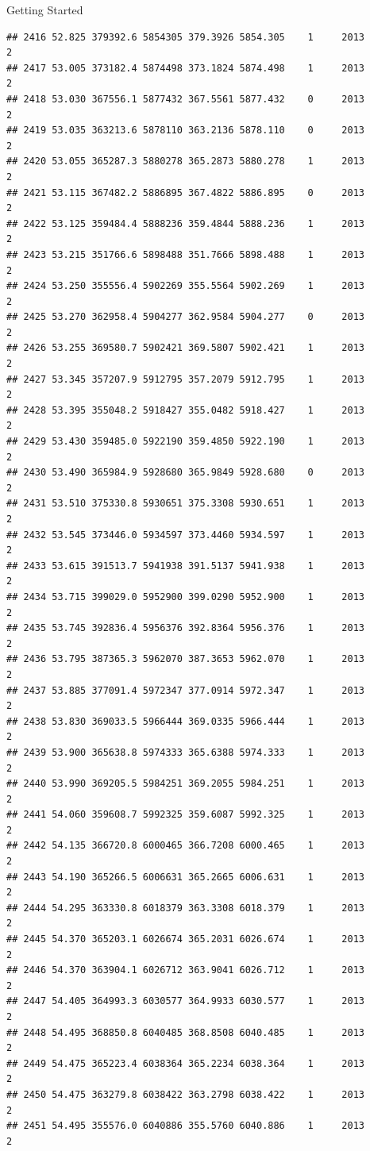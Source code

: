 \documentclass[
  ignorenonframetext,
]{beamer}
\begin{document}
\begin{frame}[fragile]{Getting Started}
\begin{verbatim}
## 2416 52.825 379392.6 5854305 379.3926 5854.305    1     2013        2
## 2417 53.005 373182.4 5874498 373.1824 5874.498    1     2013        2
## 2418 53.030 367556.1 5877432 367.5561 5877.432    0     2013        2
## 2419 53.035 363213.6 5878110 363.2136 5878.110    0     2013        2
## 2420 53.055 365287.3 5880278 365.2873 5880.278    1     2013        2
## 2421 53.115 367482.2 5886895 367.4822 5886.895    0     2013        2
## 2422 53.125 359484.4 5888236 359.4844 5888.236    1     2013        2
## 2423 53.215 351766.6 5898488 351.7666 5898.488    1     2013        2
## 2424 53.250 355556.4 5902269 355.5564 5902.269    1     2013        2
## 2425 53.270 362958.4 5904277 362.9584 5904.277    0     2013        2
## 2426 53.255 369580.7 5902421 369.5807 5902.421    1     2013        2
## 2427 53.345 357207.9 5912795 357.2079 5912.795    1     2013        2
## 2428 53.395 355048.2 5918427 355.0482 5918.427    1     2013        2
## 2429 53.430 359485.0 5922190 359.4850 5922.190    1     2013        2
## 2430 53.490 365984.9 5928680 365.9849 5928.680    0     2013        2
## 2431 53.510 375330.8 5930651 375.3308 5930.651    1     2013        2
## 2432 53.545 373446.0 5934597 373.4460 5934.597    1     2013        2
## 2433 53.615 391513.7 5941938 391.5137 5941.938    1     2013        2
## 2434 53.715 399029.0 5952900 399.0290 5952.900    1     2013        2
## 2435 53.745 392836.4 5956376 392.8364 5956.376    1     2013        2
## 2436 53.795 387365.3 5962070 387.3653 5962.070    1     2013        2
## 2437 53.885 377091.4 5972347 377.0914 5972.347    1     2013        2
## 2438 53.830 369033.5 5966444 369.0335 5966.444    1     2013        2
## 2439 53.900 365638.8 5974333 365.6388 5974.333    1     2013        2
## 2440 53.990 369205.5 5984251 369.2055 5984.251    1     2013        2
## 2441 54.060 359608.7 5992325 359.6087 5992.325    1     2013        2
## 2442 54.135 366720.8 6000465 366.7208 6000.465    1     2013        2
## 2443 54.190 365266.5 6006631 365.2665 6006.631    1     2013        2
## 2444 54.295 363330.8 6018379 363.3308 6018.379    1     2013        2
## 2445 54.370 365203.1 6026674 365.2031 6026.674    1     2013        2
## 2446 54.370 363904.1 6026712 363.9041 6026.712    1     2013        2
## 2447 54.405 364993.3 6030577 364.9933 6030.577    1     2013        2
## 2448 54.495 368850.8 6040485 368.8508 6040.485    1     2013        2
## 2449 54.475 365223.4 6038364 365.2234 6038.364    1     2013        2
## 2450 54.475 363279.8 6038422 363.2798 6038.422    1     2013        2
## 2451 54.495 355576.0 6040886 355.5760 6040.886    1     2013        2

\end{verbatim}
\end{frame}
\end{document}
